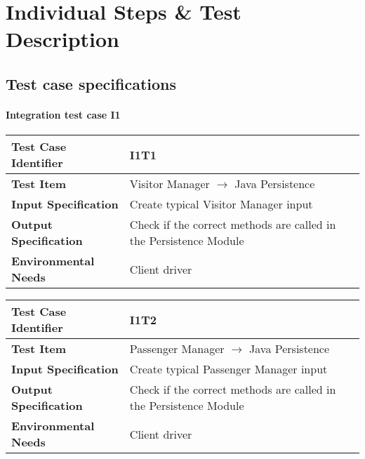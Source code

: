 \chapter{Individual Steps \& Test Description} \label{chap3}

\section{Test case specifications}

\subsubsection{Integration test case I1}
\begin{table}[!htbp]
\begin{center}
\begin{tabular}[t]{p{}p{}}

\hline
\textbf{Test Case Identifier} & I1T1 \\
\hline
\textbf{Test Item} & Visitor Manager $\rightarrow$ Java Persistence \\
\hline
\textbf{Input Specification} & Create typical Visitor Manager input  \\
\hline
\textbf{Output Specification} & Check if the correct methods are called in the Persistence Module \\
\hline
\textbf{Environmental Needs} & Client driver \\
\hline

\end{tabular}
\end{center}
\end{table}

\begin{table}[!htbp]
\begin{center}
\begin{tabular}[t]{p{}p{}}

\hline
\textbf{Test Case Identifier} & I1T2 \\
\hline
\textbf{Test Item} & Passenger Manager $\rightarrow$ Java Persistence \\
\hline
\textbf{Input Specification} & Create typical Passenger Manager input \\
\hline
\textbf{Output Specification} & Check if the correct methods are called in the Persistence Module \\
\hline
\textbf{Environmental Needs} & Client driver \\
\hline

\end{tabular}
\end{center}
\end{table}

